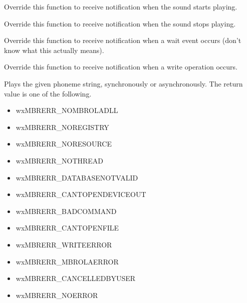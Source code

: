 \label{wxmbrolaonstart}


Override this function to receive notification when the sound starts playing.

\label{wxmbrolaonstop}


Override this function to receive notification when the sound stops playing.

\label{wxmbrolaonwait}


Override this function to receive notification when a wait event occurs (don't
know what this actually means).

\label{wxmbrolaonwrite}


Override this function to receive notification when a write operation occurs.

\label{wxmbrolaplay}




Plays the given phoneme string, synchronously or asynchronously.
The return value is one of the following.

\begin{itemize}\itemsep=0pt
\item wxMBRERR\_NOMBROLADLL
\item wxMBRERR\_NOREGISTRY
\item wxMBRERR\_NORESOURCE
\item wxMBRERR\_NOTHREAD
\item wxMBRERR\_DATABASENOTVALID
\item wxMBRERR\_CANTOPENDEVICEOUT
\item wxMBRERR\_BADCOMMAND
\item wxMBRERR\_CANTOPENFILE
\item wxMBRERR\_WRITEERROR
\item wxMBRERR\_MBROLAERROR
\item wxMBRERR\_CANCELLEDBYUSER
\item wxMBRERR\_NOERROR
\end{itemize}

